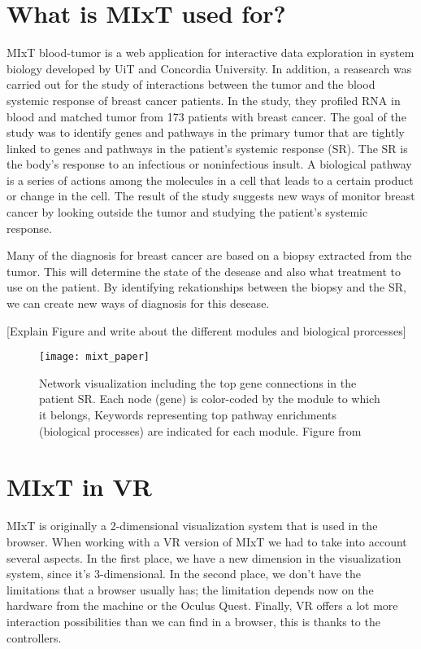 
\section{What is MIxT used for?}
MIxT blood-tumor is a web application for interactive data exploration in system biology developed by UiT and Concordia University\cite{fjukstad_dumeaux_olsen_lund_hallett_bongo_2017}. In addition, a reasearch was carried out for the study of interactions between the tumor and the blood systemic response of breast cancer patients\cite{dumeaux_fjukstad_interactions_tumor_blood}. In the study, they profiled RNA in blood and matched tumor from 173 patients with breast cancer. The goal of the study was to identify genes and pathways in the primary tumor that are tightly linked to genes and pathways in the patient's systemic response (SR). The SR is the body's response to an infectious or noninfectious insult. A biological pathway is a series of actions among the molecules in a cell that leads to a certain product or change in the cell. The result of the study suggests new ways of monitor breast cancer by looking outside the tumor and studying the patient's systemic response.

Many of the diagnosis for breast cancer are based on a biopsy extracted from the tumor. This will determine the state of the desease and also what treatment to use on the patient. By identifying rekationships between the biopsy and the SR, we can create new ways of diagnosis for this desease.

[Explain Figure and write about the different modules and biological prorcesses]

\begin{figure}[h!]
    \setlength{\tempheight}{15ex}
    \centering
    \texttt{[image: mixt\_paper]}
    \caption{Network visualization including the top gene connections in the patient SR. Each node (gene) is color-coded by the module to which it belongs, Keywords representing top pathway enrichments (biological processes) are indicated for each module. Figure from \cite{dumeaux_fjukstad_interactions_tumor_blood}}
    \label{fig:mixt_paper}
\end{figure}

\section{MIxT in VR}
MIxT is originally a 2-dimensional visualization system that is used in the browser. When working with a VR version of MIxT we had to take into account several aspects. In the first place, we have a new dimension in the visualization system, since it's 3-dimensional. In the second place, we don't have the limitations that a browser usually has; the limitation depends now on the hardware from the machine or the Oculus Quest. Finally, VR offers a lot more interaction possibilities than we can find in a browser, this is thanks to the controllers.

